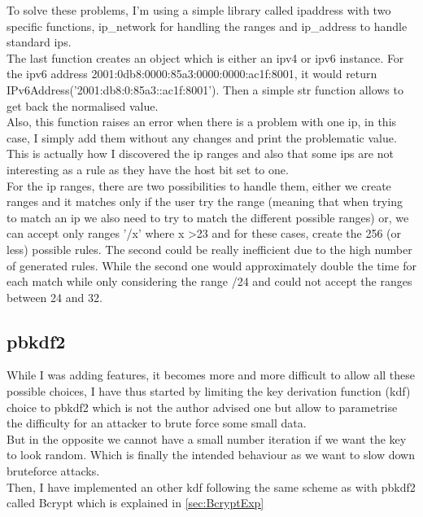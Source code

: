 \documentclass{eplmastersthesis}
\begin{document}
To solve these problems, I'm using a simple library called ipaddress with two specific functions, ip\_network for handling the ranges and ip\_address to handle standard \gls{ip}s.\\
The last function creates an object which is either an \gls{ipv4} or \gls{ipv6} instance. For the \gls{ipv6} address 2001:0db8:0000:85a3:0000:0000:ac1f:8001, it would return IPv6Address('2001:db8:0:85a3::ac1f:8001'). Then a simple str function allows to get back the normalised value.\\
Also, this function raises  an error when there is a problem with one \gls{ip}, in this case, I simply add them without any changes and print the problematic value.\\
This is actually how I discovered the \gls{ip} ranges and also that some \gls{ip}s are not interesting as a rule as they have the host bit set to one.\\

For the \gls{ip} ranges, there are two possibilities to handle them, either we create ranges and it matches only if the user try the range (meaning that when trying to match an \gls{ip} we also need to try to match the different possible ranges) or, we can accept only ranges '/x' where x >23 and for these cases, create the 256 (or less) possible rules.
The second could be really inefficient due to the high number of generated rules. While the second one would approximately double the time for each match while only considering the range /24 and could not accept the ranges between 24 and 32.


\subsection{\gls{pbkdf2}}
While I was adding features, it becomes more and more difficult to allow all these possible choices, I have thus started by limiting the key derivation function (\gls{kdf}) choice to \gls{pbkdf2} which is not the author advised one but allow to parametrise the difficulty for an attacker to brute force some small data.\\
But in the opposite we cannot have a small number iteration if we want the key to look random. Which is finally the intended behaviour as we want to slow down bruteforce attacks.\\
Then, I have implemented an other \gls{kdf} following the same scheme as with \gls{pbkdf2} called Bcrypt which is explained in \ref{sec:BcryptExp}
\end{document}
